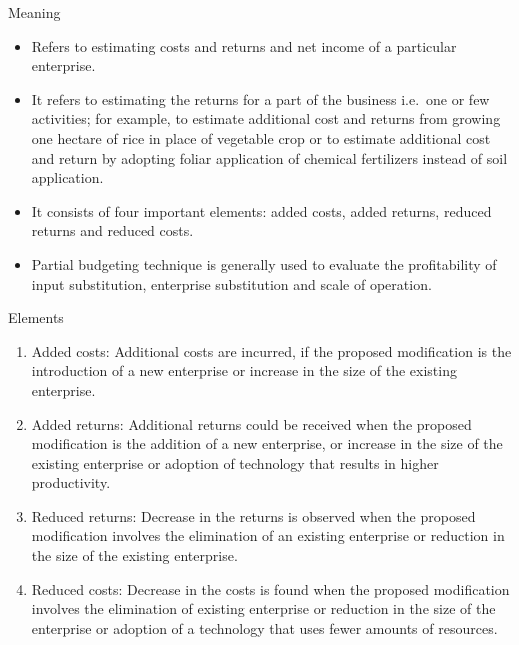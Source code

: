 \documentclass[12pt,ignorenonframetext,aspectratio=169]{beamer}
\providecommand{\tightlist}{%
  \setlength{\itemsep}{0pt}\setlength{\parskip}{0pt}}
\begin{document}
\begin{frame}{Meaning}
\protect\hypertarget{meaning}{}
\begin{itemize}
\tightlist
\item
  Refers to estimating costs and returns and net income of a particular
  enterprise.
\item
  It refers to estimating the returns for a part of the business
  i.e.~one or few activities; for example, to estimate additional cost
  and returns from growing one hectare of rice in place of vegetable
  crop or to estimate additional cost and return by adopting foliar
  application of chemical fertilizers instead of soil application.
\item
  It consists of four important elements: added costs, added returns,
  reduced returns and reduced costs.
\item
  Partial budgeting technique is generally used to evaluate the
  profitability of input substitution, enterprise substitution and scale
  of operation.
\end{itemize}
\end{frame}

\begin{frame}{Elements}
\protect\hypertarget{elements}{}
\begin{enumerate}
\tightlist
\item
  Added costs: Additional costs are incurred, if the proposed
  modification is the introduction of a new enterprise or increase in
  the size of the existing enterprise.
\item
  Added returns: Additional returns could be received when the proposed
  modification is the addition of a new enterprise, or increase in the
  size of the existing enterprise or adoption of technology that results
  in higher productivity.
\item
  Reduced returns: Decrease in the returns is observed when the proposed
  modification involves the elimination of an existing enterprise or
  reduction in the size of the existing enterprise.
\item
  Reduced costs: Decrease in the costs is found when the proposed
  modification involves the elimination of existing enterprise or
  reduction in the size of the enterprise or adoption of a technology
  that uses fewer amounts of resources.
\end{enumerate}
\end{frame}
\end{document}
